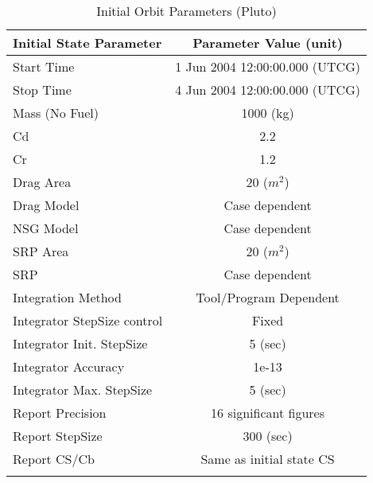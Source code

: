 \begin{table}[htbp!]
\centering \caption{Initial Orbit Parameters (Pluto)}
      \begin{tabular}{lc}
      \hline\hline
            Initial State Parameter & Parameter Value (unit)\\
            \hline
            Start Time & 1 Jun 2004 12:00:00.000 (UTCG)\\
            Stop Time & 4 Jun 2004 12:00:00.000 (UTCG)\\
            
            Mass (No Fuel) & 1000 (kg)\\
            Cd & 2.2\\
            Cr & 1.2\\
            Drag Area & 20 ($m^2$)\\
            Drag Model & Case dependent\\
            NSG Model & Case dependent\\
            SRP Area & 20 ($m^2$)\\
            SRP & Case dependent\\
            Integration Method & Tool/Program Dependent\\
            Integrator StepSize control & Fixed\\
            Integrator Init. StepSize & 5 (sec)\\
            Integrator Accuracy & 1e-13\\
            Integrator Max. StepSize & 5 (sec)\\
            Report Precision & 16 significant figures\\
            Report StepSize & 300 (sec)\\
            Report CS/Cb & Same as initial state CS\\
      \hline\hline
      \label{Table: InitStatePluto}
\end{tabular}
\end{table}

